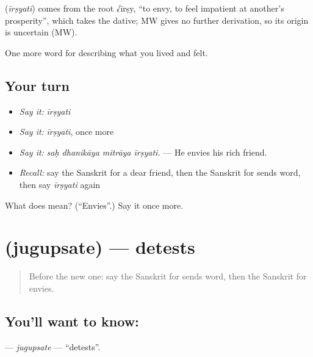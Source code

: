 \begin{cousinweb}
\textbf{} (\emph{īrṣyati}) comes from the root √īrṣy, \textquotedblleft{}to envy, to feel impatient at another's prosperity\textquotedblright{}, which takes the dative; MW gives no further derivation, so its origin is uncertain (MW).
\end{cousinweb}

\begin{grammarlens}[title={What you've built}]
One more word for describing what you lived and felt.
\end{grammarlens}

\subsection*{Your turn}
\begin{itemize}
\raggedright
  \item \emph{Say it:} \emph{īrṣyati}
  \item \emph{Say it:} \emph{īrṣyati}, once more
  \item \emph{Say it:} \emph{saḥ dhanikāya mitrāya īrṣyati.} — He envies his rich friend.
  \item \emph{Recall:} say the Sanskrit for a dear friend, then the Sanskrit for sends word, then say \emph{īrṣyati} again
\end{itemize}

\begin{tcolorbox}[breakable,colback=teal!4,colframe=teal!35!black,title={Before you move on}]
What does  mean? (\textquotedblleft{}Envies\textquotedblright{}.) Say it once more.
\end{tcolorbox}
\section[\texorpdfstring{\sk{जुगुप्सते} (jugupsate)}{जुगुप्सते (jugupsate)}]{ (jugupsate) — detests}

\label{lesson:SA-C454-jugupsate}



\begin{quote}
Before the new one: say the Sanskrit for sends word, then the Sanskrit for envies.
\end{quote}

\subsection*{You'll want to know: }
\textbf{} — \emph{jugupsate} — \textquotedblleft{}detests\textquotedblright{}.

